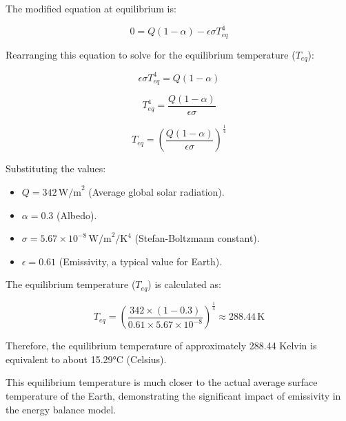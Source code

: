 \documentclass[12pt]{article}
\begin{document}
The modified equation at equilibrium is:

\begin{equation}
0 = Q(1 - \alpha) - \epsilon\sigma T_{eq}^4
\end{equation}

Rearranging this equation to solve for the equilibrium temperature ($T_{eq}$):

\begin{equation}
\epsilon\sigma T_{eq}^4 = Q(1 - \alpha)
\end{equation}

\begin{equation}
T_{eq}^4 = \frac{Q(1 - \alpha)}{\epsilon\sigma}
\end{equation}

\begin{equation}
T_{eq} = \left( \frac{Q(1 - \alpha)}{\epsilon\sigma} \right)^{\frac{1}{4}}
\end{equation}

Substituting the values:
\begin{itemize}
    \item $Q = 342 \, \text{W/m}^2$ (Average global solar radiation).
    \item $\alpha = 0.3$ (Albedo).
    \item $\sigma = 5.67 \times 10^{-8} \, \text{W/m}^2/\text{K}^4$ (Stefan-Boltzmann constant).
    \item $\epsilon = 0.61$ (Emissivity, a typical value for Earth).
\end{itemize}

The equilibrium temperature ($T_{eq}$) is calculated as:

\begin{equation}
T_{eq} = \left( \frac{342 \times (1 - 0.3)}{0.61 \times 5.67 \times 10^{-8}} \right)^{\frac{1}{4}} \approx 288.44 \, \text{K}
\end{equation}

Therefore, the equilibrium temperature of approximately 288.44 Kelvin 
is equivalent to about 15.29°C (Celsius).

This equilibrium temperature is much closer to the actual average surface temperature of the Earth, 
demonstrating the significant impact of emissivity 
in the energy balance model.
\end{document}
